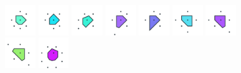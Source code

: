 \documentclass[text.tex]{subfiles}
\begin{document}
\begin{figure}[h!]
\includegraphics[width=0.12\textwidth]{img/results/circle8/circle8_103553_(-10_5alpha_2)_005.pdf}
\includegraphics[width=0.12\textwidth]{img/results/circle8/circle8_103553_(-10_5alpha_2)_006.pdf}
\includegraphics[width=0.12\textwidth]{img/results/circle8/circle8_103553_(-10_5alpha_2)_007.pdf}
\includegraphics[width=0.12\textwidth]{img/results/circle8/circle8_103553_(-10_5alpha_2)_008.pdf}
\includegraphics[width=0.12\textwidth]{img/results/circle8/circle8_103553_(-10_5alpha_2)_009.pdf}
\includegraphics[width=0.12\textwidth]{img/results/circle8/circle8_103553_(-10_5alpha_2)_010.pdf}
\includegraphics[width=0.12\textwidth]{img/results/circle8/circle8_103553_(-10_5alpha_2)_011.pdf}
\includegraphics[width=0.12\textwidth]{img/results/circle8/circle8_103553_(-10_5alpha_2)_012.pdf}
\includegraphics[width=0.12\textwidth]{img/results/circle8/circle8_103553_(-10_5alpha_2)_013.pdf}

\end{figure}
\end{document}
